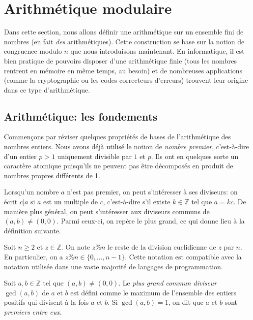 \documentclass[french,course,oneside,theoremnosection]{lecture}
\newcommand{\Z}{\mathbb{Z}}
\begin{document}
\section{Arithmétique modulaire}
Dans cette section, nous allons définir une arithmétique sur un ensemble fini de nombres (en fait \emph{des} arithmétiques). Cette construction se base sur la notion de congruence modulo $n$ que nous introduisons maintenant. En informatique, il est bien pratique de pouvoirs disposer d'une arithmétique finie (tous les nombres rentrent en mémoire en même temps, au besoin) et de nombreuses applications (comme la cryptographie ou les codes correcteurs d'erreurs) trouvent leur origine dans ce type d'arithmétique.

\subsection{Arithmétique: les fondements}
Commençons par réviser quelques propriétés de bases de l'arithmétique des nombres entiers. Nous avons déjà utilisé le notion de \emph{nombre premier}, c'est-à-dire d'un entier $p>1$ uniquement divisible par $1$ et $p$. Ils ont en quelques sorte un caractère atomique puisqu'ils ne peuvent pas être décomposés en produit de nombres propres différents de 1.

Lorsqu'un nombre $a$ n'est pas premier, on peut s'intéresser à ses diviseurs: on écrit $c | a$ si $a$ est un multiple de $c$, c'est-à-dire s'il existe $k\in \Z$ tel que $a=kc$. De manière plus général, on peut s'intéresser aux diviseurs communs de $(a,b) \neq (0,0).$ Parmi ceux-ci, on repère le plus grand, ce qui donne lieu à la définition suivante.

\begin{notation}
Soit $n \geq 2$ et $z\in \Z$. On note $z\% n$ le reste de la division euclidienne de $z$ par $n$. En particulier, on a $z\%n\in \{0, \ldots, n-1\}$. Cette notation est compatible avec la notation utilisée dans une vaste majorité de langages de programmation.
\end{notation}

\begin{definition}
Soit $a,b \in \Z$ tel que $(a,b)\neq (0,0)$. Le \emph{plus grand commun diviseur} $\gcd(a,b)$ de $a$ et $b$ est défini comme le maximum de l'ensemble des entiers positifs qui divisent à la fois $a$ et $b$. 
Si $\gcd(a,b)=1$, on dit que $a$ et $b$ sont \emph{premiers entre eux}.
\end{definition}
\end{document}
